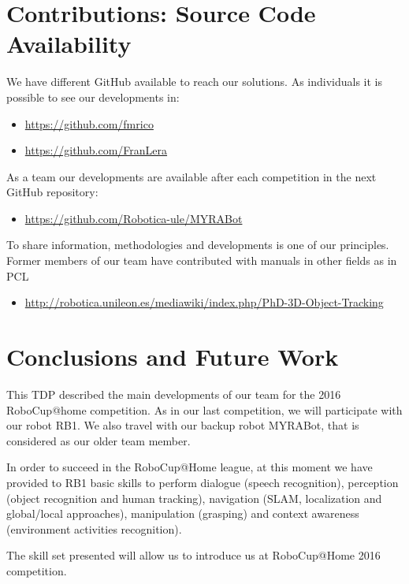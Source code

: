 \documentclass[citeauthoryear]{llncs}
\begin{document}
\section{Contributions: Source Code Availability}

We have different GitHub available to reach our solutions. 
As individuals it is possible to see our developments in:
\begin{itemize}
 \item \url{https://github.com/fmrico}
 \item \url{https://github.com/FranLera}
\end{itemize}

As a team our developments are available after each competition in the next GitHub repository:
\begin{itemize}
 \item \url{https://github.com/Robotica-ule/MYRABot}
\end{itemize}

To share information, methodologies and developments is one of our principles. Former members of our team have contributed with manuals in other fields as in PCL
\begin{itemize}
 \item \url{http://robotica.unileon.es/mediawiki/index.php/PhD-3D-Object-Tracking}
\end{itemize}




\section{Conclusions and Future Work}


This TDP described the main developments of our team for the 2016 RoboCup@home competition. 
As in our last competition, we will participate with our robot RB1. 
We also travel with our backup robot MYRABot, that is considered as our older team member.

In order to succeed in the RoboCup@Home league, at this moment we have provided to RB1 basic skills to perform dialogue  (speech recognition), perception (object recognition and human tracking), navigation (SLAM, localization and global/local approaches), manipulation (grasping) and context awareness (environment activities recognition).  

The skill set presented will allow us to introduce us at RoboCup@Home 2016 competition.
\end{document}
